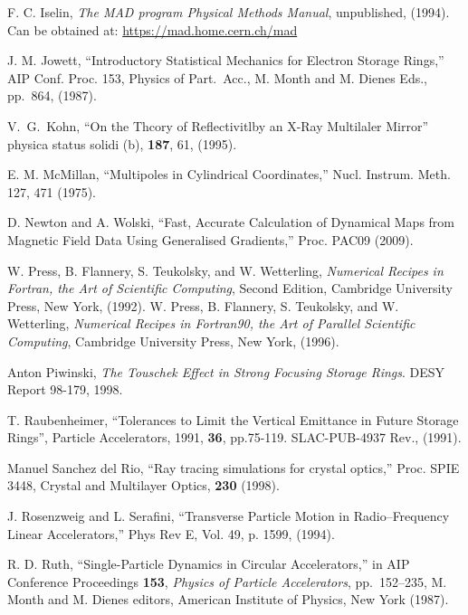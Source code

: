 \begin{thebibliography}{XXXXXXX99}
F. C. Iselin, {\it The MAD program Physical Methods Manual}, 
unpublished, (1994).  Can be obtained at: 
\hfill\break
\hspace*{0.3in}
\url{https://mad.home.cern.ch/mad}

J. M. Jowett, ``Introductory Statistical Mechanics
for Electron Storage Rings,'' AIP Conf. Proc. 153, Physics of Part.\ Acc.,
M. Month and M. Dienes Eds., pp.~864, (1987).

V.~G.~Kohn, 
``On the Thcory of Reflectivitlby an X-Ray Multilaler Mirror''
physica status solidi (b), {\bf 187}, 61, (1995).

E. M. McMillan, 
``Multipoles in Cylindrical Coordinates,''
Nucl. Instrum. Meth. 127, 471 (1975).

D. Newton and A. Wolski, 
``Fast, Accurate Calculation of Dynamical Maps from
Magnetic Field Data Using Generalised Gradients,''
Proc. PAC09 (2009).

W. Press, B. Flannery, S. Teukolsky, and W. Wetterling, {\em Numerical
Recipes in Fortran, the Art of Scientific Computing}, Second Edition,
Cambridge University Press, New York, (1992). \hfill \break
W. Press, B. Flannery, S. Teukolsky, and W. Wetterling, {\em Numerical
Recipes in Fortran90, the Art of Parallel Scientific Computing}, 
Cambridge University Press, New York, (1996).

Anton Piwinski, \emph{The Touschek Effect in Strong Focusing Storage Rings}.
DESY Report 98-179, 1998.

T. Raubenheimer,
``Tolerances to Limit the Vertical Emittance in Future Storage Rings'', 
Particle Accelerators, 1991, {\bf 36}, pp.75-119. 
SLAC-PUB-4937 Rev., (1991).

Manuel Sanchez del Rio, ``Ray tracing simulations for crystal optics,''
Proc. SPIE 3448, Crystal and Multilayer Optics, {\bf 230} (1998). 

J. Rosenzweig and L. Serafini, ``Transverse Particle Motion in
Radio--Frequency Linear Accelerators,'' Phys Rev E, Vol. 49, p. 1599,
(1994).

 R. D. Ruth, ``Single-Particle Dynamics in
Circular Accelerators,'' in AIP Conference Proceedings {\bf 153}, {\em
Physics of Particle Accelerators}, pp.~152--235, M. Month and M. Dienes editors,
American Institute of Physics, New York (1987).


\end{thebibliography}
